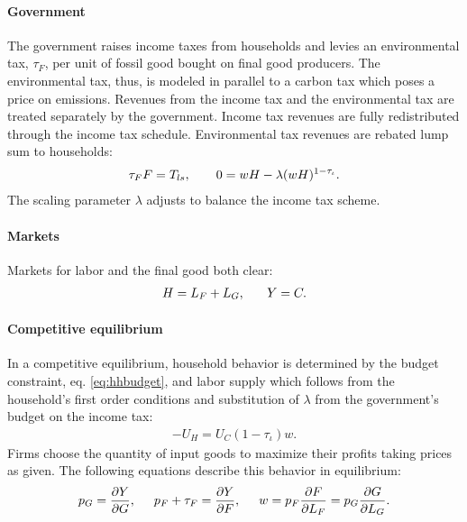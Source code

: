 \paragraph{Government}
The government raises income taxes from households and levies an environmental tax, $\tau_F$, per unit of fossil good bought on final good producers. The environmental tax, thus, is modeled in parallel to a carbon tax which poses a price on emissions. Revenues from the income tax and the environmental tax are treated separately by the government. Income tax revenues are fully redistributed through the income tax schedule. Environmental tax revenues are rebated lump sum to households:
\begin{align}
\tau_{F}F=T_{ls}, \hspace{7mm}
0={w H}-\lambda(w H)^{1-\tau_{\iota}}. \label{eq:gov_but}
\end{align}
The scaling parameter $\lambda$ adjusts to balance the income tax scheme. 

\paragraph{Markets}
Markets for labor and the final good both clear: 
\begin{align}
H=L_F+L_G,\ \hspace{5mm} Y=C. \label{eq:market_clear}
\end{align}
\paragraph{Competitive equilibrium}
In a competitive equilibrium, household behavior is determined by the budget constraint, eq. \eqref{eq:hhbudget}, and labor supply which follows from the household's first order conditions and substitution of $\lambda$ from the government's budget on the income tax:
\begin{align}
-U_H=U_C(1-\tau_{\iota})w. \label{eq:hsup}
\end{align}
Firms choose the quantity of input goods to maximize their profits taking prices as given. The following equations describe this behavior in equilibrium:
\begin{align}
p_G=\frac{\partial Y}{\partial G}, \hspace{5mm}
p_F +\tau_{F} = \frac{\partial Y}{\partial F}, \hspace{5mm}
w= p_F\frac{\partial F}{\partial L_F}=p_G\frac{\partial G}{\partial L_G}.\label{eq:profmax}
\end{align}


